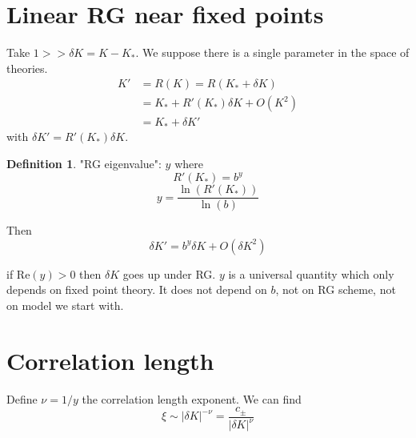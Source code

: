 \documentclass[a4paper]{book}
\theoremstyle{definition}
\newtheorem{definition}{Definition}[section]
\theoremstyle{remark}
\begin{document}
\section{Linear RG near fixed points}
Take $1 >> \delta K = K - K_*$. We suppose there is a single parameter in the space of theories. 
\begin{equation}
    \begin{aligned}
        K' &= R(K) = R(K_* + \delta K) \\
        &= K_* + R'(K_*)\delta K + O(K^2) \\
        &= K_* + \delta K'
    \end{aligned}
\end{equation}
with $\delta K' = R'(K_*)\delta K$. 

\begin{definition}
    "RG eigenvalue": $y$ where
    \begin{equation}
        R'(K_*) = b^y
    \end{equation}
    \begin{equation}
        y = \frac{\ln(R'(K_*))}{\ln(b)}
    \end{equation}
\end{definition}

Then 
\begin{equation}
    \delta K' = b^y \delta K + O(\delta K^2)
\end{equation}

if $\text{Re}(y)>0$ then $\delta K$ goes up under RG. $y$ is a universal quantity which only depends on fixed point theory. It does not depend on $b$, not on RG scheme, not on model we start with. 

\section{Correlation length}
Define $\nu = 1/y$ the correlation length exponent. We can find 
\begin{equation}
    \xi \sim |\delta K |^{-\nu} = \frac{c_\pm}{|\delta K |^{\nu}}
\end{equation}
\end{document}
